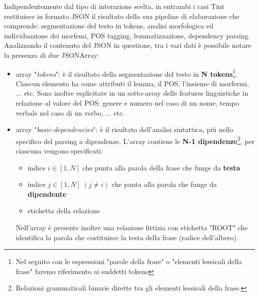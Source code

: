 Indipendentemente dal tipo di interazione scelta, in entrambi i casi Tint restituisce in formato JSON il risultato della sua pipeline di elaborazione che comprende: segmentazione del testo in tokens, analisi morfologica ed individuazione dei morfemi, POS tagging, lemmatizzazione,  dependency parsing. \\
Analizzando il contenuto del JSON in questione, tra i vari dati è possibile notare la presenza di due JSONArray:
\begin{itemize}
	\item array "\textit{tokens}": 
	è il risultato della segmentazione del testo in \textbf{N tokens}\footnote{Nel seguito con le espressioni "parole della frase" o "elementi lessicali della frase" faremo riferimento ai suddetti tokens}.
	Ciascun elemento ha come attributi il lemma, il POS, l'insieme di morfermi, ... etc. Sono inoltre esplicitate in un sotto-array delle features linguistiche in relazione al valore del POS: genere e numero nel caso di un nome, tempo verbale nel caso di un verbo, ... etc.
	\item array "\textit{basic-dependencies}": è il risultato dell'analisi sintattica, più nello specifico del parsing a dipendenze. L'array contiene le \textbf{N-1 dipendenze}\footnote{Relazioni grammaticali binarie dirette tra gli elementi lessicali della frase.}, per ciascuna vengono specificati: 
		\begin{itemize}[label=$\ast$]
			\item indice $i\in[1,N]$ che punta alla parola della frase che funge da \textbf{testa}
			\item indice $j\in[1,N] \; (j \neq i) $ che punta alla parola che funge da \textbf{dipendente}
			\item etichetta della relazione
		\end{itemize}
	Nell'array è presente inoltre una relazione fittizia con etichetta "ROOT" che identifica la parola che costituisce la testa della frase (radice dell'albero).
\end{itemize}


